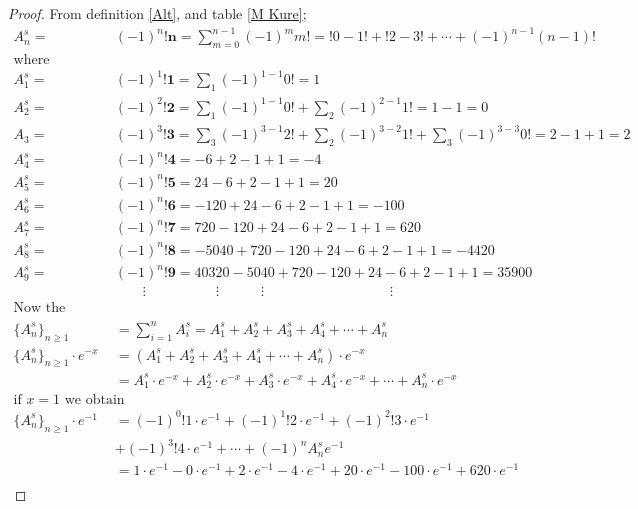 \documentclass[pdflatex,sn-mathphys-num]{sn-jnl}%
\theoremstyle{thmstyleone}%
\theoremstyle{thmstyletwo}%
\theoremstyle{thmstylethree}%
\begin{document}
\begin{proof}
From definition \ref{Alt}, and table \ref{M Kure};
\begin{align*}
A_n^s=&(-1)^n\mathbf{!n}=\sum_{m=0}^{n-1}(-1)^{m}m!= !0 - 1!+ !2 - 3!  + \cdots + (-1)^{n-1}(n-1)!\\ \mbox{where}\\
 A_1^s=&(-1)^1\mathbf{!1}=\sum_{1}(-1)^{1-1}0!= 1\\
A_2^s=&(-1)^2\mathbf{!2}=\sum_{1} (-1)^{1-1}0!+ \sum_{2}(-1)^{2-1}1!= 1-1=0\\
A_3=&(-1)^3\mathbf{!3}= \sum_{3}(-1)^{3-1}2!+ \sum_{2}(-1)^{3-2}1!+\sum_{3} (-1)^{3-3}0!= 2-1+1=2\\
A_4^s=&(-1)^n\mathbf{!4}=-6+2-1+1=-4\\
A_5^s=&(-1)^n\mathbf{!5}=24-6+2-1+1=20\\
A_6^s=&(-1)^n\mathbf{!6}=-120+24-6+2-1+1=-100\\
A_7^s=&(-1)^n\mathbf{!7}=720-120+24-6+2-1+1=620\\
A_8^s=&(-1)^n\mathbf{!8}=-5040+720-120+24-6+2-1+1=-4420\\
A_9^s=&(-1)^n\mathbf{!9}=40320-5040+720-120+24-6+2-1+1=35900\\
&\quad \quad \vdots\quad \quad \quad \quad \quad \vdots \quad \quad \quad\vdots \quad \quad \quad \quad \quad \quad \quad \quad  \quad\vdots \quad \quad\\
\mbox{Now the sequence}\\
\lbrace A_n^s\rbrace_{n\geq 1}&=\sum_{i=1}^{n}A_i^s=A_1^s + A_2^s + A_3^s +A_4^s +\cdots + A_n^s\\
\lbrace A_n^s\rbrace_{n\geq 1}\cdotp e^{-x}&= (A_1^s + A_2^s + A_3^s +A_4^s +\cdots + A_n^s)\cdotp e^{-x}\\
&= A_1^s\cdotp e^{-x} + A_2^s \cdotp e^{-x}+ A_3^s \cdotp e^{-x}+A_4^s \cdotp e^{-x}+\cdots + A_n^s \cdotp e^{-x}\\ 
\mbox{if $x=1$ we obtain}\\
\lbrace A_n^s\rbrace_{n\geq 1}\cdotp e^{-1}&= (-1)^0 !1\cdotp e^{-1} + (-1)^1 !2\cdotp e^{-1} + (-1)^2 !3\cdotp e^{-1}\\ 
&+ (-1)^3 !4\cdotp e^{-1} +\cdots + (-1)^n A_n^s e^{-1}\\
&= 1\cdotp e^{-1} -  0\cdotp e^{-1} + 2\cdotp e^{-1} - 4\cdotp e^{-1} + 20\cdotp e^{-1} -100\cdotp e^{-1}+ 620\cdotp e^{-1}\\

\end{align*}
\end{proof}
\end{document}
